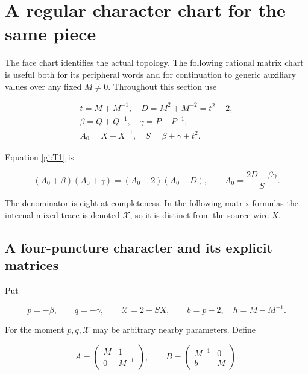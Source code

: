 \section{A regular character chart for the same piece}\label{gi:a-regular-character-chart-for-the-same-piece}

The face chart identifies the actual topology. The following rational
matrix chart is useful both for its peripheral words and for continuation
to generic auxiliary values over any fixed \(M\ne0\).
Throughout this section use

\begin{equation}\label{gi:C0}
\begin{gathered}
 t=M+M^{-1},\quad D=M^2+M^{-2}=t^2-2,\\
 \beta=Q+Q^{-1},\quad\gamma=P+P^{-1},\\
 A_0=X+X^{-1},\quad S=\beta+\gamma+t^2.
 \end{gathered}
\end{equation}

Equation \eqref{gi:T1} is

\begin{equation}\label{gi:C0a}
(A_0+\beta)(A_0+\gamma)=(A_0-2)(A_0-D),\qquad
 A_0=\frac{2D-\beta\gamma}{S}.
\end{equation}

The denominator is eight at completeness. In the following matrix
formulas the internal mixed trace is denoted \(\mathcal X\), so it
is distinct from the source wire \(X\).

\subsection{A four-puncture character and its explicit matrices}\label{gi:a-four-puncture-character-and-its-explicit-matrices}

Put

\begin{equation}\label{gi:C5}
p=-\beta,\qquad q=-\gamma,\qquad \mathcal X=2+SX,
 \qquad b=p-2,\quad h=M-M^{-1}.
\end{equation}

For the moment \(p,q,\mathcal X\) may be arbitrary nearby parameters. Define

\begin{equation}\label{gi:C6}
A=\begin{pmatrix}M&1\\0&M^{-1}\end{pmatrix},
 \qquad
 B=\begin{pmatrix}M^{-1}&0\\b&M\end{pmatrix}.
\end{equation}

